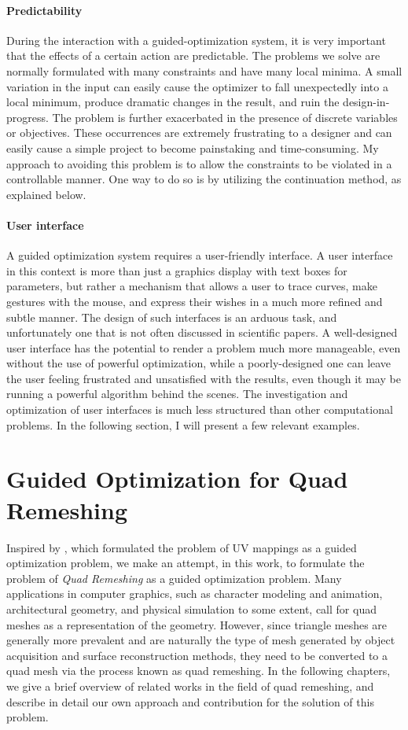 \paragraph*{Predictability}
During the interaction with a guided-optimization system, it is very important that the effects of a certain action are predictable. The problems we solve are normally formulated with many constraints and have many local minima. A small variation in the input can easily cause the optimizer to fall unexpectedly into a local minimum, produce dramatic changes in the result, and ruin the design-in-progress. The problem is further exacerbated in the presence of discrete variables or objectives. These occurrences are extremely frustrating to a designer and can easily cause a simple project to become painstaking and time-consuming. My approach to avoiding this problem is to allow the constraints to be violated in a controllable manner. One way to do so is by utilizing the continuation method, as explained below.

\paragraph*{User interface}
A guided optimization system requires a user-friendly interface. A user interface in this context is more than just a graphics display with text boxes for parameters, but rather a mechanism that allows a user to trace curves, make gestures with the mouse, and express their wishes in a much more refined and subtle manner. The design of such interfaces is an arduous task, and unfortunately one that is not often discussed in scientific papers. A well-designed user interface has the potential to render a problem much more manageable, even without the use of powerful optimization, while a poorly-designed one can leave the user feeling frustrated and unsatisfied with the results, even though it may be running a powerful algorithm behind the scenes. The investigation and optimization of user interfaces is much less structured than other computational problems. In the following section, I will present a few relevant examples.

\section{Guided Optimization for Quad Remeshing}
Inspired by \cite{Poranne:Autocuts:2017}, which formulated the problem of UV mappings as a guided optimization problem, we make an attempt, in this work, to formulate the problem of \emph{Quad Remeshing} as a guided optimization problem.
Many applications in computer graphics, such as character modeling and animation, architectural geometry, and physical simulation to some extent, call for quad meshes as a representation of the geometry. However, since triangle meshes are generally more prevalent and are naturally the type of mesh generated by object acquisition and surface reconstruction methods, they need to be converted to a quad mesh via the process known as quad remeshing. In the following chapters, we give a brief overview of related works in the field of quad remeshing, and describe in detail our own approach and contribution for the solution of this problem.
